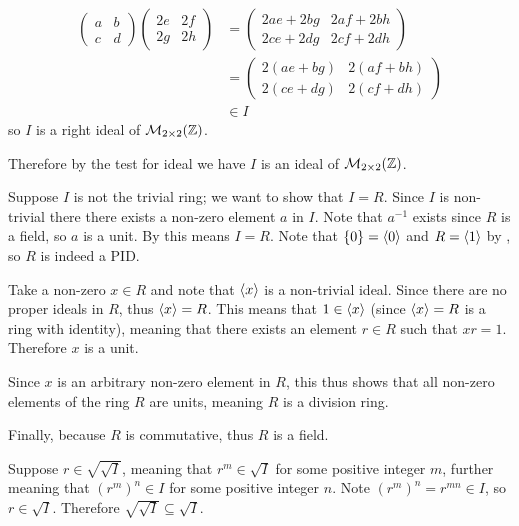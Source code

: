 \begin{questions}
\begin{itemize}
        \begin{align*}
            \begin{pmatrix}a&b\\c&d\end{pmatrix}\begin{pmatrix}2e&2f\\2g&2h\end{pmatrix} &= \begin{pmatrix}2ae+2bg&2af+2bh\\2ce+2dg&2cf+2dh\end{pmatrix}\\
            &= \begin{pmatrix}2(ae+bg)&2(af+bh)\\2(ce+dg)&2(cf+dh)\end{pmatrix}\\
            &\in I
        \end{align*}
        so $I$ is a right ideal of $\mathcal{M}_{2\times2}(\mathbb{Z})$.
    \end{itemize}
    Therefore by the test for ideal we have $I$ is an ideal of $\mathcal{M}_{2\times2}(\mathbb{Z})$.

    \item \begin{partquestions}{\alph*}
        \item Suppose $I$ is not the trivial ring; we want to show that $I = R$. Since $I$ is non-trivial there there exists a non-zero element $a$ in $I$. Note that $a^{-1}$ exists since $R$ is a field, so $a$ is a unit. By  this means $I = R$. Note that $\{0\} = \left\langle0\right\rangle$ and $R = \left\langle1\right\rangle$ by , so $R$ is indeed a PID.

        \item Take a non-zero $x \in R$ and note that $\left\langle x\right\rangle$ is a non-trivial ideal. Since there are no proper ideals in $R$, thus $\left\langle x\right\rangle = R$. This means that $1 \in \left\langle x\right\rangle$ (since $\left\langle x\right\rangle = R$ is a ring with identity), meaning that there exists an element $r \in R$ such that $xr = 1$. Therefore $x$ is a unit.
        
        Since $x$ is an arbitrary non-zero element in $R$, this thus shows that all non-zero elements of the ring $R$ are units, meaning $R$ is a division ring.

        Finally, because $R$ is commutative, thus $R$ is a field.
    \end{partquestions}

    \item \begin{partquestions}{\alph*}
        \item Suppose $r \in \sqrt{\sqrt{I}}$, meaning that $r^m \in \sqrt{I}$ for some positive integer $m$, further meaning that $(r^m)^n \in I$ for some positive integer $n$. Note $(r^m)^n = r^{mn} \in I$, so $r \in \sqrt{I}$. Therefore $\sqrt{\sqrt{I}} \subseteq \sqrt{I}$.
        

\end{partquestions}
\end{questions}
